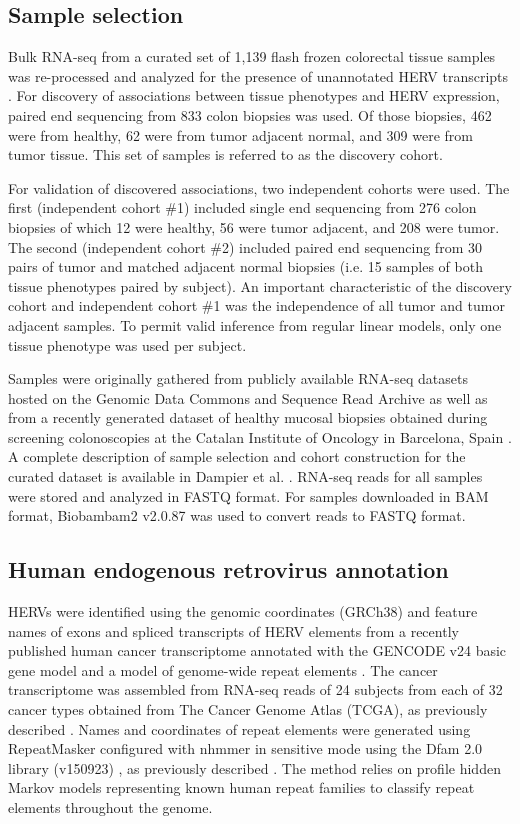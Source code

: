 \subsection*{Sample selection}
Bulk RNA-seq from a curated set of 1,139 flash frozen colorectal tissue samples was re-processed and analyzed for the presence of unannotated HERV transcripts \citep{Dampier2020}.
For discovery of associations between tissue phenotypes and HERV expression, paired end sequencing from 833 colon biopsies was used.
Of those biopsies, 462 were from healthy, 62 were from tumor adjacent normal, and 309 were from tumor tissue.
This set of samples is referred to as the discovery cohort.

For validation of discovered associations, two independent cohorts were used.
The first (independent cohort \#1) included single end sequencing from 276 colon biopsies of which 12 were healthy, 56 were tumor adjacent, and 208 were tumor.
The second (independent cohort \#2) included paired end sequencing from 30 pairs of tumor and matched adjacent normal biopsies (i.e. 15 samples of both tissue phenotypes paired by subject).
An important characteristic of the discovery cohort and independent cohort \#1 was the independence of all tumor and tumor adjacent samples.
To permit valid inference from regular linear models, only one tissue phenotype was used per subject.

Samples were originally gathered from publicly available RNA-seq datasets hosted on the Genomic Data Commons and Sequence Read Archive as well as from a recently generated dataset of healthy mucosal biopsies obtained during screening colonoscopies at the Catalan Institute of Oncology in Barcelona, Spain \citep{Dampier2020, DiezObrero2020}.
A complete description of sample selection and cohort construction for the curated dataset is available in Dampier et al. \citep{Dampier2020}.
RNA-seq reads for all samples were stored and analyzed in FASTQ format.
For samples downloaded in BAM format, Biobambam2 v2.0.87 \citep{Tischler2014} was used to convert reads to FASTQ format.

\subsection*{Human endogenous retrovirus annotation}
HERVs were identified using the genomic coordinates (GRCh38) and feature names of exons and spliced transcripts of HERV elements from a recently published human cancer transcriptome annotated with the GENCODE v24 basic gene model \citep{Frankish2018} and a model of genome-wide repeat elements \citep{Attig2019}.
The cancer transcriptome was assembled from RNA-seq reads of 24 subjects from each of 32 cancer types obtained from The Cancer Genome Atlas (TCGA), as previously described \citep{Attig2019}.
Names and coordinates of repeat elements were generated using RepeatMasker \citep{Smit2015} configured with nhmmer \citep{Wheeler2013} in sensitive mode using the Dfam 2.0 library (v150923) \citep{Hubley2015}, as previously described \citep{Attig2017}.
The method relies on profile hidden Markov models representing known human repeat families to classify repeat elements throughout the genome.

